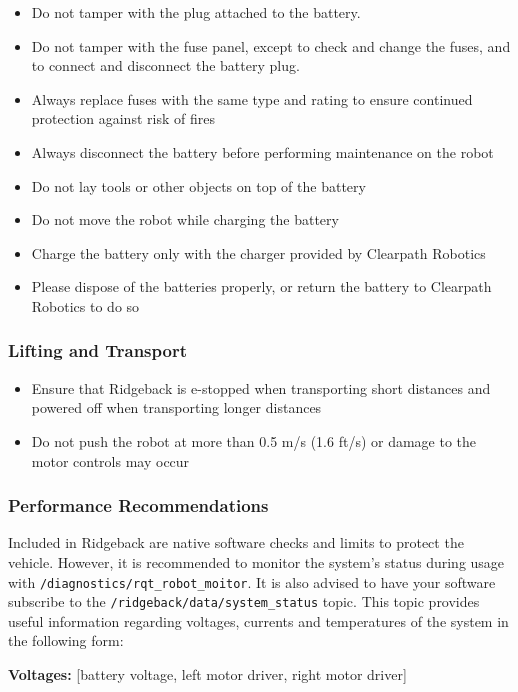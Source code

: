 \documentclass[]{clearpath-latex/clearpath-manual}
\begin{document}
\begin{itemize}[nolistsep]
	\item Do not tamper with the plug attached to the battery.
	\item Do not tamper with the fuse panel, except to check and change the fuses, and to connect and disconnect the 	battery plug.
	\item Always replace fuses with the same type and rating to ensure continued protection against risk of fires
	\item Always disconnect the battery before performing maintenance on the robot
	\item Do not lay tools or other objects on top of the battery   
	\item Do not move the robot while charging the battery
	\item Charge the battery only with the charger provided by Clearpath Robotics
	\item Please dispose of the batteries properly, or return the battery to Clearpath Robotics to do so
\end{itemize}

\subsubsection{Lifting and Transport}

\begin{itemize}[nolistsep]
	\item Ensure that Ridgeback is e-stopped when transporting short distances and powered off when transporting longer distances
	\item Do not push the robot at more than 0.5 m/s (1.6 ft/s) or damage to the motor controls may occur
\end{itemize}

\subsubsection{Performance Recommendations}

Included in Ridgeback are native software checks and limits to protect the vehicle. However, it is recommended to monitor the system’s status during usage with \lstinline{/diagnostics/rqt_robot_moitor}. It is also advised to have your software subscribe to the \lstinline{/ridgeback/data/system_status} topic. This topic provides useful information regarding voltages, currents and temperatures of the system in the following form:

\textbf{Voltages:} [battery voltage, left motor driver, right motor driver]
\end{document}
